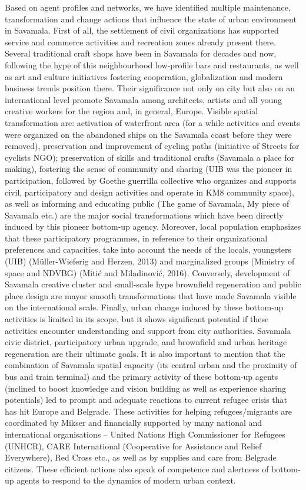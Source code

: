 \documentclass[11pt]{report}
\begin{document}
Based on agent profiles and networks, we have identified multiple maintenance, transformation and change actions that influence the state of urban environment in Savamala. First of all, the settlement of civil organizations has supported service and commerce activities and recreation zones already present there.  Several traditional craft shops have been in Savamala for decades and now, following the hype of this neighbourhood low-profile bars and restaurants, as well as art and culture initiatives fostering cooperation, globalization and modern business trends position there. Their significance not only on city but also on an international level promote Savamala among architects, artists and all young creative workers for the region and, in general, Europe.
Visible spatial transformation are: activation of waterfront area (for a while activities and events were organized on the abandoned ships on the Savamala coast before they were removed), preservation and improvement of cycling paths (initiative of Streets for cyclists NGO); preservation of skills and traditional crafts (Savamala a place for making), fostering the sense of community and sharing (UIB was the pioneer in participation, followed by Goethe guerrilla collective who organizes and supports civil, participatory and design activities and operate in KM8 community space), as well as informing and educating public (The game of Savamala, My piece of Savamala etc.) are the major social transformations which have been directly induced by this pioneer bottom-up agency. Moreover, local population emphasizes that these participatory programmes, in reference to their organizational preferences and capacities, take into account the needs of the locals, youngsters (UIB) (Müller-Wieferig and Herzen, 2013) and marginalized groups (Ministry of space and NDVBG) (Mitić and Miladinović, 2016). Conversely, development of Savamala creative cluster and small-scale hype brownfield regeneration and public place design are mayor smooth transformations that have made Savamala visible on the international scale.
Finally, urban change induced by these bottom-up activities is limited in its scope, but it shows significant potential if these activities encounter understanding and support from city authorities. Savamala civic district, participatory urban upgrade, and brownfield and urban heritage regeneration are their ultimate goals. It is also important to mention that the combination of Savamala spatial capacity (its central urban and the proximity of bus and train terminal) and the primary activity of these bottom-up agents (inclined to boost knowledge and vision building as well as experience sharing potentials) led to prompt and adequate reactions to current refugee crisis that has hit Europe and Belgrade. These activities for helping refugees/migrants are coordinated by Mikser and financially supported by many national and international organisations – United Nations High Commissioner for Refugees (UNHCR), CARE International (Cooperative for Assistance and Relief Everywhere), Red Cross etc., as well as by supplies and care from Belgrade citizens.  These efficient actions also speak of competence and alertness of bottom-up agents to respond to the dynamics of modern urban context.
\end{document}
